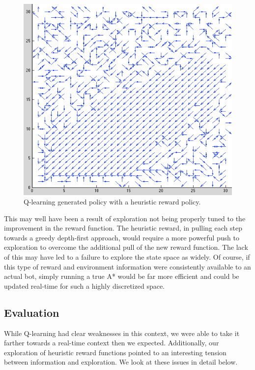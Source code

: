 \documentclass{aiaa-tc}%
\begin{document}
\begin{figure}[htbp]
  \centering
  \includegraphics[width=\linewidth]{images/HeuristicPolicy.png} 
  \caption{Q-learning generated policy with a heuristic reward policy.}
  \label{fig:heuristicQ}
\end{figure}
\clearpage

This may well have been a result of exploration
not being properly tuned to the improvement in the reward
function. The heuristic reward, in pulling each step towards a greedy
depth-first approach, would require a more powerful push to exploration
to overcome the additional pull of the new reward function. The lack
of this may have led to a failure to explore
the state space as widely. Of course, if this type
of reward and environment information were consistently available to an actual bot,
simply
running a true A* would be far more
efficient and could be updated real-time for such a highly discretized
space.

\subsection{Evaluation}

While Q-learning had clear weaknesses in this context, we were able to take it farther towards a real-time context then we expected. Additionally, our exploration of heuristic reward functions pointed to an interesting tension between information and exploration. We look at these issues in detail below.
\end{document}
